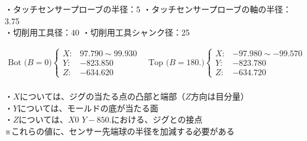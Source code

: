\begin{tcolorbox}[title={内面溝加工に関する工具(T31, T50)の情報}, fonttitle=\gtfamily\bfseries]
・タッチセンサープローブの半径：5 \quad ・タッチセンサープローブの軸の半径：3.75\\
・切削用工具径：40 \quad ・切削用工具シャンク径：25
\end{tcolorbox}
\begin{tcolorbox}[title={2023/07/28時点の\MMname 実測値}, fonttitle=\gtfamily\bfseries]
\begin{align*}
  \text{Bot ($B=0$)}
  \left\{
  \begin{array}{rl}
    X: & 97.790 \sim 99.930\\
    Y: & -823.850\\
    Z: & -634.620
  \end{array}
  \right.\quad
  \text{Top ($B=180.$)}
  \left\{
  \begin{array}{rl}
    X: & -97.980 \sim -99.570\\
    Y: & -823.780\\
    Z: & -634.720
  \end{array}
  \right.
\end{align*}\\
・$X$については、ジグの当たる点の凸部と端部（$Z$方向は目分量）\\
・$Y$については、モールドの底が当たる面\\
・$Z$については、$X0$ $Y-850.$における、ジグとの接点\\
※これらの値に、センサー先端球の半径を加減する必要がある
\end{tcolorbox}











